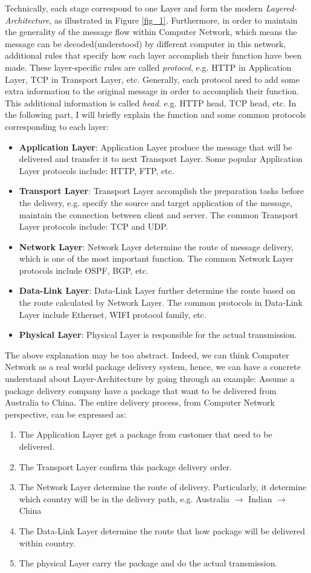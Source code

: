 \documentclass[10pt,a4paper]{article}
\begin{document}
Technically, each stage correspond to one Layer and form the modern \textit{Layered-Architecture}, as illustrated in Figure \ref{fig_1}. Furthermore, in order to maintain the generality of the message flow within Computer Network, which means the message can be decoded(understood) by different computer in this network, additional rules that specify how each layer accomplish their function have been made. These layer-specific rules are called \textit{protocol}, \textsf{e.g.} HTTP in Application Layer, TCP in Transport Layer, etc. Generally, each protocol need to add some extra information to the original message in order to accomplish their function. This additional information is called \textit{head}. \textsf{e.g.} HTTP head, TCP head, etc. In the following part, I will briefly explain the function and some common protocols corresponding to each layer:
\begin{itemize}
	\item \textbf{Application Layer}: Application Layer produce the message that will be delivered and transfer it to next Transport Layer. Some popular Application Layer protocols include: HTTP, FTP, etc.
	\item \textbf{Transport Layer}: Transport Layer accomplish the preparation tasks before the delivery, e.g. specify the source and target application of the message, maintain the connection between client and server. The common Transport Layer protocols include: TCP and UDP.
	\item \textbf{Network Layer}: Network Layer determine the route of message delivery, which is one of the most important function. The common Network Layer protocols include OSPF, BGP, etc.
	\item \textbf{Data-Link Layer}: Data-Link Layer further determine the route based on the route calculated by Network Layer. The common protocols in Data-Link Layer include Ethernet, WIFI protocol family, etc.
	\item \textbf{Physical Layer}: Physical Layer is responsible for the actual  transmission.  
\end{itemize}
The above explanation may be too abstract. Indeed, we can think Computer Network as a real world package delivery system, hence, we can have a concrete understand about Layer-Architecture by going through an example: Assume a package delivery company have a package that want to be delivered from Australia to China. The entire delivery process, from Computer Network perspective, can be expressed as:
\begin{enumerate}
	\item The Application Layer get a package from customer that need to be delivered.
	\item The Transport Layer confirm this package delivery order.
	\item The Network Layer determine the route of delivery. Particularly, it determine  which country will be in the delivery path, e.g. Australia $\rightarrow$ Indian $\rightarrow$ China
	\item The Data-Link Layer determine the route that how package will be delivered within country.
	\item The physical Layer carry the package and do the actual transmission.
\end{enumerate}
\end{document}
